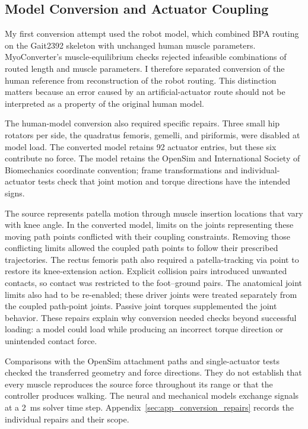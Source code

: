 \subsection{Model Conversion and Actuator Coupling}\label{sec:sns_existing_tools}

My first conversion attempt used the robot model, which combined BPA routing on the Gait2392 skeleton with unchanged human muscle parameters. MyoConverter's muscle-equilibrium checks rejected infeasible combinations of routed length and muscle parameters. I therefore separated conversion of the human reference from reconstruction of the robot routing. This distinction matters because an error caused by an artificial-actuator route should not be interpreted as a property of the original human model.

The human-model conversion also required specific repairs. Three small hip rotators per side, the quadratus femoris, gemelli, and piriformis, were disabled at model load. The converted model retains 92 actuator entries, but these six contribute no force. The model retains the OpenSim and International Society of Biomechanics coordinate convention; frame transformations and individual-actuator tests check that joint motion and torque directions have the intended signs.

The source represents patella motion through muscle insertion locations that vary with knee angle. In the converted model, limits on the joints representing these moving path points conflicted with their coupling constraints. Removing those conflicting limits allowed the coupled path points to follow their prescribed trajectories. The rectus femoris path also required a patella-tracking via point to restore its knee-extension action. Explicit collision pairs introduced unwanted contacts, so contact was restricted to the foot--ground pairs. The anatomical joint limits also had to be re-enabled; these driver joints were treated separately from the coupled path-point joints. Passive joint torques supplemented the joint behavior. These repairs explain why conversion needed checks beyond successful loading: a model could load while producing an incorrect torque direction or unintended contact force.

Comparisons with the OpenSim attachment paths and single-actuator tests checked the transferred geometry and force directions. They do not establish that every muscle reproduces the source force throughout its range or that the controller produces walking. The neural and mechanical models exchange signals at a \qty{2}{\milli\second} solver time step. Appendix~\ref{sec:app_conversion_repairs} records the individual repairs and their scope.

